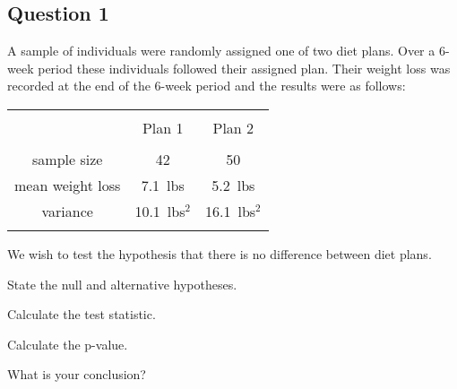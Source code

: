 \documentclass[a4paper,12pt]{article}
\begin{document}
\subsection*{Question 1}
A sample of individuals were randomly assigned one of two diet plans. 
Over a 6-week period these individuals followed their assigned plan. 
Their weight loss was recorded at the end of the 6-week period and the results were as follows: \\
\begin{center}
\begin{tabular}{|c|c|c|}
\hline
&&\\[-0.4cm]
& Plan 1 & Plan 2 \\
\hline
&&\\[-0.4cm]
sample size & 42 & 50 \\
mean weight loss & 7.1\,\,\,lbs & 5.2\,\,\,lbs \\
variance & 10.1\,\,\,lbs$^2$ & 16.1\,\,\,lbs$^2$ \\
\hline
\multicolumn{3}{c}{}\\[-0.3cm]
\end{tabular}
\end{center}

We wish to test the hypothesis that there is no difference between diet plans.\\[0.2cm]
\item State the null and alternative hypotheses. 
 \item Calculate the test statistic. 
 \\\item Calculate the p-value. 
 \item What is your conclusion?
\end{document}
